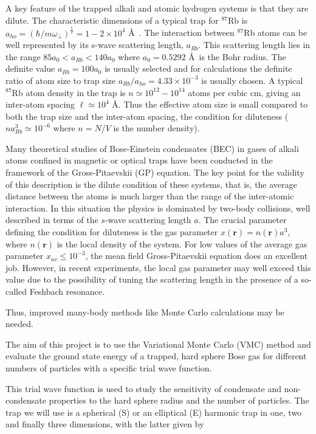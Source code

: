 \documentclass[%
oneside,                 %
final,                   %
10pt]{article}
\begin{document}
A key feature of the trapped alkali and atomic hydrogen systems is
that they are dilute. The characteristic dimensions of a typical trap
for $^{87}$Rb is $a_{ho}=\left(
 {\hbar}/{m\omega_\perp}\right)^\frac{1}{2}=1-2 \times 10^4$ \AA\
 . The interaction between $^{87}$Rb atoms can be well represented by
 its s-wave scattering length, $a_{Rb}$. This scattering length lies
 in the range $85 a_0 < a_{Rb} < 140 a_0$ where $a_0 = 0.5292$ \AA\ is
 the Bohr radius.  The definite value $a_{Rb} = 100 a_0$ is usually
 selected and for calculations the definite ratio of atom size to trap
 size $a_{Rb}/a_{ho} = 4.33 \times 10^{-3}$ is usually chosen. A
 typical $^{87}$Rb atom density in the trap is $n \simeq 10^{12}-
 10^{14}$ atoms per cubic cm, giving an inter-atom spacing $\ell
 \simeq 10^4$ \AA. Thus the effective atom size is small compared to
 both the trap size and the inter-atom spacing, the condition for
 diluteness ($na^3_{Rb} \simeq 10^{-6}$ where $n = N/V$ is the number
 density).

Many theoretical studies of Bose-Einstein condensates (BEC) in gases
of alkali atoms confined in magnetic or optical traps have been
conducted in the framework of the Gross-Pitaevskii (GP) equation.  The
key point for the validity of this description is the dilute condition
of these systems, that is, the average distance between the atoms is
much larger than the range of the inter-atomic interaction. In this
situation the physics is dominated by two-body collisions, well
described in terms of the $s$-wave scattering length $a$.  The crucial
parameter defining the condition for diluteness is the gas parameter
$x(\mathbf{r})= n(\mathbf{r}) a^3$, where $n(\mathbf{r})$ is the local density
of the system. For low values of the average gas parameter $x_{av}\le 10^{-3}$, the mean field Gross-Pitaevskii equation does an excellent
job.  However,
in recent experiments, the local gas parameter may well exceed this
value due to the possibility of tuning the scattering length in the
presence of a so-called Feshbach resonance.

Thus, improved many-body methods like Monte Carlo calculations may be
needed.

The aim of this project is to use the Variational Monte Carlo
(VMC) method and evaluate the ground state energy of a trapped, hard
sphere Bose gas for different numbers of particles with a specific
trial wave function.

This trial wave function is used to study the sensitivity of
 condensate and non-condensate properties to the hard sphere radius
 and the number of particles.  The trap we will use is a spherical (S)
 or an elliptical (E) harmonic trap in one, two and finally three
 dimensions, with the latter given by
\end{document}
